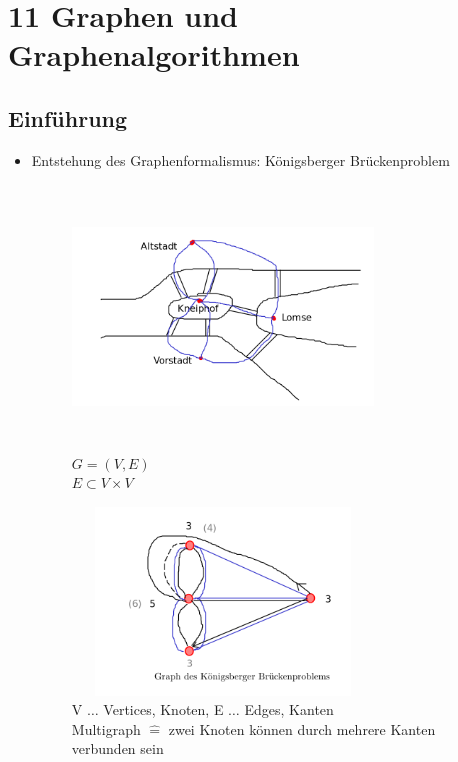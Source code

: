 
\chapter*{11 Graphen und Graphenalgorithmen}
\section*{Einführung}

\begin{itemize}
    \item Entstehung des Graphenformalismus: Königsberger Brückenproblem

    \begin{figure}[htbp]
        \begin{minipage}[t]{8cm}
            \centering
            \vspace{0cm}
            \includegraphics[width=8cm,height=7cm,keepaspectratio]{./Pictures/Koenigsberg.png}\\
            $G = (V, E)$\\
            $E \subset V \times V$
        \end{minipage}
        \begin{minipage}[t]{8cm}
            \vspace{0cm}
            \includegraphics[width=8cm,height=5cm,keepaspectratio]{./Pictures/Brueckengraph.png}\\
            V $\dots$ Vertices, Knoten, E $\dots$ Edges, Kanten\\
            Multigraph $\widehat{=}$ zwei Knoten können durch mehrere Kanten verbunden sein
        \end{minipage}
    \end{figure}


\end{itemize}
